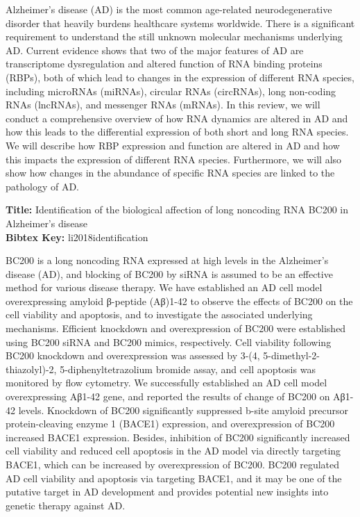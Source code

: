 \documentclass[11pt]{article}
\begin{document}
Alzheimer’s disease (AD) is the most common age-related neurodegenerative disorder that heavily burdens healthcare systems worldwide. 
There is a significant requirement to understand the still unknown molecular mechanisms underlying AD. 
Current evidence shows that two of the major features of AD are transcriptome dysregulation and altered function of RNA binding proteins (RBPs), both of which lead to changes in the expression of different RNA species, including microRNAs (miRNAs), circular RNAs (circRNAs), long non-coding RNAs (lncRNAs), and messenger RNAs (mRNAs). 
In this review, we will conduct a comprehensive overview of how RNA dynamics are altered in AD and how this leads to the differential expression of both short and long RNA species. 
We will describe how RBP expression and function are altered in AD and how this impacts the expression of different RNA species. 
Furthermore, we will also show how changes in the abundance of specific RNA species are linked to the pathology of AD.

\textbf{Title: }Identification of the biological affection of long noncoding RNA BC200 in Alzheimer’s disease\\
\textbf{Bibtex Key: }li2018identification\\
\cite{li2018identification}

BC200 is a long noncoding RNA expressed at high levels in the Alzheimer’s disease (AD), and blocking of BC200 by siRNA is assumed to be an effective method for various disease therapy. 
We have established an AD cell model overexpressing amyloid β-peptide (Aβ)1-42 to observe the effects of BC200 on the cell viability and apoptosis, and to investigate the associated underlying mechanisms. 
Efficient knockdown and overexpression of BC200 were established using BC200 siRNA and BC200 mimics, respectively. 
Cell viability following BC200 knockdown and overexpression was assessed by 3-(4, 5-dimethyl-2-thiazolyl)-2, 5-diphenyltetrazolium bromide assay, and cell apoptosis was monitored by flow cytometry. 
We successfully established an AD cell model overexpressing Aβ1-42 gene, and reported the results of change of BC200 on Aβ1-42 levels. 
Knockdown of BC200 significantly suppressed b-site amyloid precursor protein-cleaving enzyme 1 (BACE1) expression, and overexpression of BC200 increased BACE1 expression. 
Besides, inhibition of BC200 significantly increased cell viability and reduced cell apoptosis in the AD model via directly targeting BACE1, which can be increased by overexpression of BC200. 
BC200 regulated AD cell viability and apoptosis via targeting BACE1, and it may be one of the putative target in AD development and provides potential new insights into genetic therapy against AD.



\end{document}
